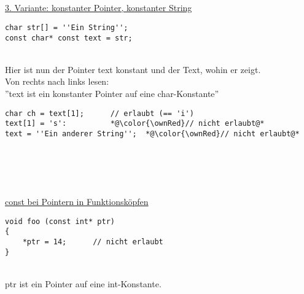 \\ \\ \\ \\
\underline{3. Variante: konstanter Pointer, konstanter String}\\
\noindent
\begin{minipage}{\linewidth}
\begin{lstlisting}
char str[] = ''Ein String'';
const char* const text = str;
\end{lstlisting}
\end{minipage}
\\
Hier ist nun der Pointer text konstant und der Text, wohin er zeigt.\\
Von rechts nach links lesen:\\''text ist ein konstanter Pointer auf eine char-Konstante''\\
\noindent
\begin{minipage}{\linewidth}
\begin{lstlisting}
char ch = text[1];		// erlaubt (== 'i')
text[1] = 's':			*@\color{\ownRed}// nicht erlaubt@*
text = ''Ein anderer String'';	*@\color{\ownRed}// nicht erlaubt@*
\end{lstlisting}
\end{minipage}
\\ \\ \\ \\
\underline{const bei Pointern in Funktionsköpfen}\\
\noindent
\begin{minipage}{\linewidth}
\begin{lstlisting}
void foo (const int* ptr)
{
	*ptr = 14;		// nicht erlaubt
}
\end{lstlisting}
\end{minipage}
\\
ptr ist ein Pointer auf eine int-Konstante.
\\

